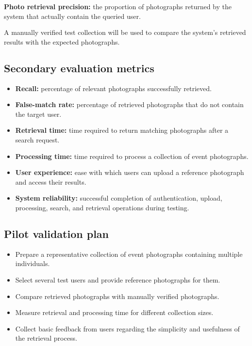 \documentclass[11pt,a4paper]{article}
\begin{document}
\textbf{Photo retrieval precision:} the proportion of photographs
returned by the system that actually contain the queried user.

A manually verified test collection will be used to compare the
system's retrieved results with the expected photographs.

\subsection{Secondary evaluation metrics}

\begin{itemize}[leftmargin=0.7cm]

    \item \textbf{Recall:} percentage of relevant photographs
    successfully retrieved.

    \item \textbf{False-match rate:} percentage of retrieved
    photographs that do not contain the target user.

    \item \textbf{Retrieval time:} time required to return matching
    photographs after a search request.

    \item \textbf{Processing time:} time required to process a
    collection of event photographs.

    \item \textbf{User experience:} ease with which users can upload a
    reference photograph and access their results.

    \item \textbf{System reliability:} successful completion of
    authentication, upload, processing, search, and retrieval
    operations during testing.

\end{itemize}

\subsection{Pilot validation plan}

\begin{itemize}[leftmargin=0.7cm]

    \item Prepare a representative collection of event photographs
    containing multiple individuals.

    \item Select several test users and provide reference photographs
    for them.

    \item Compare retrieved photographs with manually verified
    photographs.

    \item Measure retrieval and processing time for different
    collection sizes.

    \item Collect basic feedback from users regarding the simplicity
    and usefulness of the retrieval process.

\end{itemize}
\end{document}
